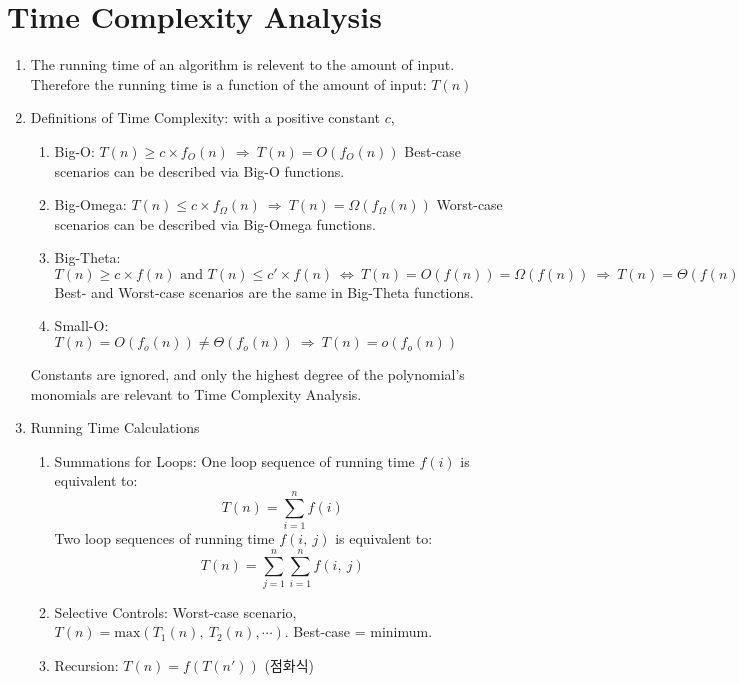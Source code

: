 \chapter{Time Complexity Analysis}
\begin{enumerate}
\item The running time of an algorithm is relevent to the amount of input.
    Therefore the running time is a function of the amount of input: $T(n)$
\item Definitions of Time Complexity: with a positive constant $c$,
    \begin{enumerate}
    \item Big-O: $T(n)\geq c\times f_O(n)~\Rightarrow~T(n)=O\left(f_O(n)\right)$
        Best-case scenarios can be described via Big-O functions.
    \item Big-Omega: $T(n)\leq c\times f_{\Omega}(n)~\Rightarrow~T(n)=\Omega
        \left(f_{\Omega}(n)\right)$ Worst-case scenarios can be described via
        Big-Omega functions.
    \item Big-Theta: $T(n)\geq c\times f(n)\text{ and }T(n)\leq c'\times f(n)~
        \Leftrightarrow~T(n)=O(f(n))=\Omega(f(n))~\Rightarrow~T(n)=\Theta(f(n))$
        Best- and Worst-case scenarios are the same in Big-Theta functions.
    \item Small-O: $T(n)=O(f_o(n))\neq\Theta(f_o(n))~\Rightarrow~T(n)=o(f_o(n))$
    \end{enumerate}
    Constants are ignored, and only the highest degree of the polynomial's
    monomials are relevant to Time Complexity Analysis.
\item Running Time Calculations
    \begin{enumerate}
    \item Summations for Loops: One loop sequence of running time $f(i)$ is
        equivalent to: \[ T(n)=\sum_{i=1}^nf(i) \] Two loop sequences of running
        time $f(i,~j)$ is equivalent to:\[T(n)=\sum_{j=1}^n\sum_{i=1}^nf(i,~j)\]
    \item Selective Controls: Worst-case scenario, $T(n)=\mathrm{max}\left(
        T_1(n),~T_2(n),\cdots\right)$. Best-case = minimum.
    \item Recursion: $T(n)=f(T(n'))$ (점화식)
    \end{enumerate}
\end{enumerate}
